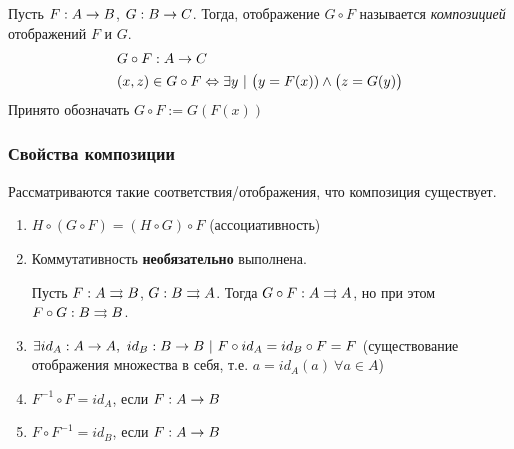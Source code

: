 \begin{definition}
	Пусть $F : A \rightarrow B$, $G : B \rightarrow C$. Тогда, отображение $G \circ F$ называется \textit{композицией} отображений $F$ и $G$.
	\begin{align*}
	&G \circ F : A \rightarrow C
	\\
	&(x, z) \in G \circ F \Leftrightarrow \exists y\ |\ \big(y = F(x)) \wedge \big(z =  G(y)\big)
	\end{align*}
	Принято обозначать $G \circ F := G(F(x))$
\end{definition}

\subsubsection*{Свойства композиции}

Рассматриваются такие соответствия/отображения, что композиция существует.
\begin{enumerate}
	\item $H \circ (G \circ F) = (H \circ G) \circ F$ (ассоциативность)
	\item Коммутативность \textbf{необязательно} выполнена.
	\begin{example}
		Пусть $F : A \rightrightarrows B$, $G : B \rightrightarrows A$. Тогда $G \circ F : A \rightrightarrows A$, но при этом $F \circ G : B \rightrightarrows B$.
	\end{example}
	\item $\exists id_A : A \rightarrow A,\ id_B : B \rightarrow B\ |\ F \circ id_A = id_B \circ F = F$ (существование отображения множества в себя, т.е. $a = id_A(a)\ \forall a \in A$)
	\item $F^{-1} \circ F = id_A$, если $F : A \rightarrow B$
	\item $F \circ F^{-1} = id_B$, если $F : A \rightarrow B$
\end{enumerate}